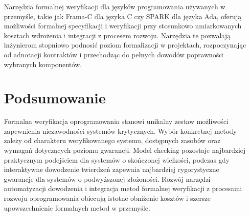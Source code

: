 \documentclass[
    language=polish,
    doctype=article,
]{../../omnilatex}
\begin{document}
Narzędzia formalnej weryfikacji dla języków programowania używanych w przemyśle, takie jak Frama-C dla języka C czy SPARK dla języka Ada, oferują możliwości formalnej specyfikacji i weryfikacji przy stosunkowo umiarkowanych kosztach wdrożenia i integracji z procesem rozwoju. Narzędzia te pozwalają inżynierom stopniowo podnosić poziom formalizacji w projektach, rozpoczynając od adnotacji kontraktów i przechodząc do pełnych dowodów poprawności wybranych komponentów.

\section{Podsumowanie}
Formalna weryfikacja oprogramowania stanowi unikalny zestaw możliwości zapewnienia niezawodności systemów krytycznych. Wybór konkretnej metody zależy od charakteru weryfikowanego systemu, dostępnych zasobów oraz wymagań dotyczących poziomu gwarancji. Model checking pozostaje najbardziej praktycznym podejściem dla systemów o skończonej wielkości, podczas gdy interaktywne dowodzenie twierdzeń zapewnia najbardziej rygorystyczne gwarancje dla systemów o podwyższonej złożoności. Rozwój narzędzi automatyzacji dowodzenia i integracja metod formalnej weryfikacji z procesami rozwoju oprogramowania obiecują istotne obniżenie kosztów i szersze upowszechnienie formalnych metod w przemyśle.
\end{document}
